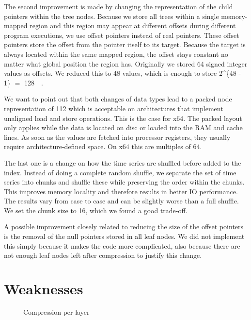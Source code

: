 The second improvement is made by changing the representation of the child pointers within the tree nodes. Because we store all trees within a single memory-mapped region and this region may appear at different offsets during different program executions, we use offset pointers instead of real pointers. These offset pointers store the offset from the pointer itself to its target. Because the target is always located within the same mapped region, the offset stays constant no matter what global position the region has. Originally we stored \SI{64}{\bit} signed integer values as offsets. We reduced this to \SI{48}{\bit} values, which is enough to store \SI[parse-numbers = false]{2^{48 - 1}}{\byte} $=$ \SI{128}{\tera\byte}.

We want to point out that both changes of data types lead to a packed node representation of \SI{112}{\bit} which is acceptable on architectures that implement unaligned load and store operations. This is the case for x64. The packed layout only applies while the data is located on disc or loaded into the RAM and cache lines. As soon as the values are fetched into processor registers, they usually require architecture-defined space. On x64 this are multiples of \SI{64}{\bit}.

The last one is a change on how the time series are shuffled before added to the index. Instead of doing a complete random shuffle, we separate the set of time series into chunks and shuffle these while preserving the order within the chunks. This improves memory locality and therefore results in better IO performance. The results vary from case to case and can be slightly worse than a full shuffle. We set the chunk size to \num{16}, which we found a good trade-off.

A possible improvement closely related to reducing the size of the offset pointers is the removal of the null pointers stored in all leaf nodes. We did not implement this simply because it makes the code more complicated, also because there are not enough leaf nodes left after compression to justify this change.



\section{Weaknesses}
\label{sec:algorithm:weak}

\begin{figure}
    \centering
    
    \caption{Compression per layer}\label{fig:weakness}
\end{figure}


